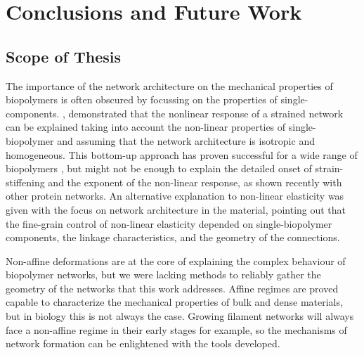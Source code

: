 \chapter{Conclusions and Future Work}
\label{Chapter-Conclusions}

\section{Scope of Thesis}%
\label{sec:scope_of_thesis}

The importance of the network architecture on the mechanical properties of biopolymers is often obscured by focussing on the properties of single-components. \cite{storm_nonlinear_2005}, demonstrated that the nonlinear response of a strained network can be explained taking into account the non-linear properties of single-biopolymer and assuming that the network architecture is isotropic and homogeneous. This bottom-up approach has proven successful for a wide range of biopolymers \cite{carrillo_nonlinear_2013}, but might not be enough to explain the detailed onset of strain-stiffening and the exponent of the non-linear response, as shown recently with other protein networks\cite{licup_stress_2015}. An alternative explanation to non-linear elasticity was given with the focus on network architecture in the material\cite{onck_alternative_2005}, pointing out that the fine-grain control of non-linear elasticity depended on single-biopolymer components, the linkage characteristics, and the geometry of the connections.


Non-affine deformations are at the core of explaining the complex behaviour of biopolymer networks, but we were lacking methods to reliably gather the geometry of the networks that this work addresses. Affine regimes are proved capable to characterize the mechanical properties of bulk and dense materials, but in biology this is not always the case. Growing filament networks will always face a non-affine regime in their early stages for example, so the mechanisms of network formation can be enlightened with the tools developed.

